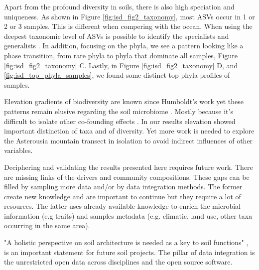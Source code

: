 Apart from the profound diversity in soils, there is also high speciation and uniqueness. 
As shown in Figure \ref{fig:isd_fig2_taxonomy}, most ASVs occur in 1 or 2 or 3 samples.
This is different when compering with the ocean. When using the deepest taxonomic
level of ASVs is possible to identify the specialists and generalists \parencite{Barberan2012}. 
In addition, focusing on the phyla, we see a pattern looking like a phase transition, from 
rare phyla to phyla that dominate all samples, Figure \ref{fig:isd_fig2_taxonomy} C. Lastly, in Figure \ref{fig:isd_fig2_taxonomy} D,
and \ref{fig:isd_top_phyla_samples}, we found some distinct top phyla profiles of samples.

Elevation gradients of biodiversity are known since Humboldt's work \parencite{Rahbek2019} 
yet these patterns remain elusive regarding the soil microbiome \parencite{Looby2020, Siles2023}.
Mostly because it's difficult to isolate other co-founding effects \parencite{Nottingham2018}.
In our results elevation showed important distinction of taxa and of diversity. Yet more work is 
needed to explore the Asterousia mountain transect in isolation to avoid indirect influences of 
other variables.

Deciphering and validating the results presented here requires future work.
There are missing links of the drivers and community compositions. These 
gaps can be filled by sampling more data and/or by data integration methods.
The former create new knowledge and are important to continue but they 
require a lot of resources. The latter uses already available knowledge 
to enrich the microbial information (e.g traits) and samples metadata
(e.g. climatic, land use, other taxa occurring in the same area).

"A holistic perspective on soil architecture is needed as a key to soil functions" \parencite{philippot2024the-interplay}, is 
an important statement for future soil projects.
The pillar of data integration is the unrestricted open data across disciplines and 
the open source software. 


